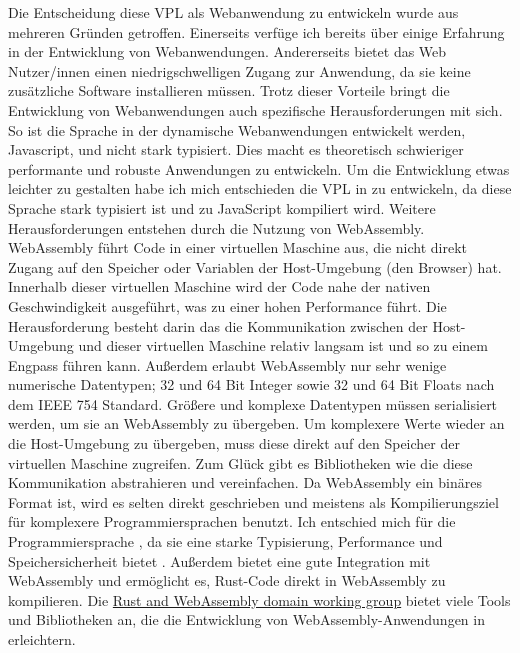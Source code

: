 \documentclass[ngerman]{article}
\begin{document}
Die Entscheidung diese VPL als Webanwendung zu entwickeln wurde aus mehreren Gründen getroffen. 
Einerseits verfüge ich bereits über einige Erfahrung in der Entwicklung von Webanwendungen. 
Andererseits bietet das Web Nutzer/innen einen niedrigschwelligen Zugang zur Anwendung, da sie keine zusätzliche Software installieren müssen.
\br
Trotz dieser Vorteile bringt die Entwicklung von Webanwendungen auch spezifische Herausforderungen mit sich.
So ist die Sprache in der dynamische Webanwendungen entwickelt werden, Javascript,  und nicht stark typisiert. 
Dies macht es theoretisch schwieriger performante und robuste Anwendungen zu entwickeln. 
Um die Entwicklung etwas leichter zu gestalten habe ich mich entschieden die VPL in  zu entwickeln, da diese Sprache stark typisiert ist und zu JavaScript kompiliert wird.
\br
Weitere Herausforderungen entstehen durch die Nutzung von WebAssembly. 
WebAssembly führt Code in einer virtuellen Maschine aus, die nicht direkt Zugang auf den Speicher oder Variablen der Host-Umgebung (den Browser) hat.
Innerhalb dieser virtuellen Maschine wird der Code nahe der nativen Geschwindigkeit ausgeführt, was zu einer hohen Performance führt. 
Die Herausforderung besteht darin das die Kommunikation zwischen der Host-Umgebung und dieser virtuellen Maschine relativ langsam ist und so zu einem Engpass führen kann.
\br
Außerdem erlaubt WebAssembly nur sehr wenige numerische Datentypen; 32 und 64 Bit Integer sowie 32 und 64 Bit Floats nach dem IEEE 754 Standard. 
Größere und komplexe Datentypen müssen serialisiert werden, um sie an WebAssembly zu übergeben. 
Um komplexere Werte wieder an die Host-Umgebung zu übergeben, muss diese direkt auf den Speicher der virtuellen Maschine zugreifen.
Zum Glück gibt es Bibliotheken wie  die diese Kommunikation abstrahieren und vereinfachen.
\br
Da WebAssembly ein binäres Format ist, wird es selten direkt geschrieben und meistens als Kompilierungsziel für komplexere Programmiersprachen benutzt.
Ich entschied mich für die Programmiersprache , da sie eine starke Typisierung, Performance und Speichersicherheit bietet \cite{bugden2022rust}.
Außerdem bietet  eine gute Integration mit WebAssembly und ermöglicht es, Rust-Code direkt in WebAssembly zu kompilieren. 
Die \href{https://rustwasm.github.io/}{Rust and WebAssembly domain working group} bietet viele Tools und Bibliotheken an, die die Entwicklung von WebAssembly-Anwendungen in  erleichtern.
\end{document}
